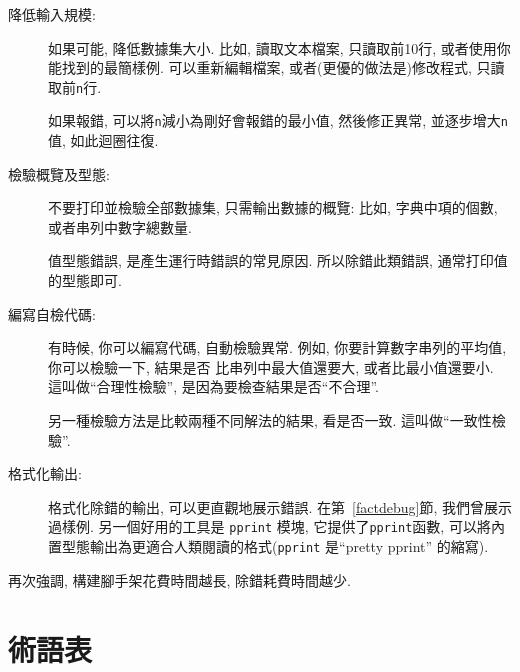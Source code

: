 \documentclass[10pt]{book}
\begin{document}
\begin{description}

\item[降低輸入規模:] 如果可能, 降低數據集大小. 比如, 讀取文本檔案, 
只讀取前10行, 或者使用你能找到的最簡樣例. 
可以重新編輯檔案, 或者(更優的做法是)修改程式, 只讀取前{\tt n}行. 

如果報錯, 可以將{\tt n}減小為剛好會報錯的最小值, 
然後修正異常, 並逐步增大{\tt n}值, 如此迴圈往復. 

\item[檢驗概覽及型態:] 不要打印並檢驗全部數據集, 只需輸出數據的概覽:
比如, 字典中項的個數, 或者串列中數字總數量. 

值型態錯誤, 是產生運行時錯誤的常見原因. 
所以除錯此類錯誤, 通常打印值的型態即可. 

\item[編寫自檢代碼:]  有時候, 你可以編寫代碼, 自動檢驗異常. 
例如, 你要計算數字串列的平均值, 你可以檢驗一下, 結果是否
比串列中最大值還要大, 或者比最小值還要小. 這叫做``合理性檢驗'', 
是因為要檢查結果是否``不合理''.  

另一種檢驗方法是比較兩種不同解法的結果, 看是否一致. 
這叫做``一致性檢驗''. 

\item[格式化輸出:] 格式化除錯的輸出, 可以更直觀地展示錯誤. 
在第~\ref{factdebug}節, 我們曾展示過樣例. 另一個好用的工具是 {\tt pprint} 模塊, 
它提供了{\tt pprint}函數, 可以將內置型態輸出為更適合人類閱讀的格式({\tt pprint}
是``pretty pprint'' 的縮寫).

\end{description}

再次強調, 構建腳手架花費時間越長, 除錯耗費時間越少. 


\section{術語表}
\end{document}

